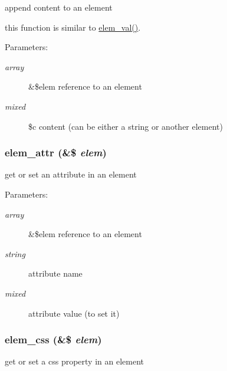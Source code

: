 append content to an element

this function is similar to \hyperlink{html_8inc_8php_e28d850c3c906c6884462ca89c06f59b}{elem\_\-val()}. \begin{Desc}
\item[Parameters:]
\begin{description}
\item[{\em array}]\&\$elem reference to an element \item[{\em mixed}]\$c content (can be either a string or another element) \end{description}
\end{Desc}
\hypertarget{html_8inc_8php_894dc22f3b7668c59364599909162b8e}{
\subsubsection[{elem\_\-attr}]{\setlength{\rightskip}{0pt plus 5cm}elem\_\-attr (\&\$ {\em elem})}}
\label{html_8inc_8php_894dc22f3b7668c59364599909162b8e}


get or set an attribute in an element

\begin{Desc}
\item[Parameters:]
\begin{description}
\item[{\em array}]\&\$elem reference to an element \item[{\em string}]attribute name \item[{\em mixed}]attribute value (to set it) \end{description}
\end{Desc}
\hypertarget{html_8inc_8php_c705ef06deb9e2d49e342ed78ecc1c9a}{
\subsubsection[{elem\_\-css}]{\setlength{\rightskip}{0pt plus 5cm}elem\_\-css (\&\$ {\em elem})}}
\label{html_8inc_8php_c705ef06deb9e2d49e342ed78ecc1c9a}


get or set a css property in an element

